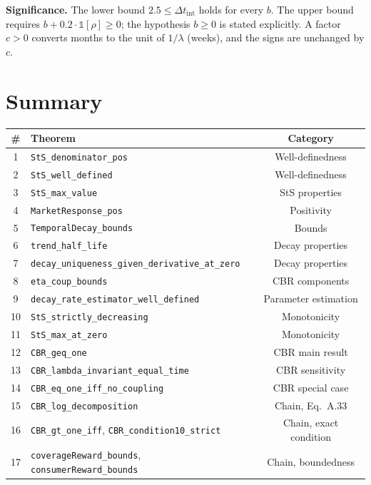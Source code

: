 \documentclass[11pt,a4paper]{article}
\begin{document}
	\noindent\textbf{Significance.} The lower bound $2.5\le\Delta t_{\text{int}}$ holds for every $b$. The upper bound requires $b+0.2\cdot\mathbb{1}[\rho]\ge0$; the hypothesis $b\ge0$ is stated explicitly. A factor $c>0$ converts months to the unit of $1/\lambda$ (weeks), and the signs are unchanged by $c$.


	\section*{Summary}
	
	\begin{table}[h]
		\centering
		\begin{tabular}{@{}clc@{}}
			\toprule
			\textbf{\#} & \textbf{Theorem} & \textbf{Category} \\
			\midrule
			1 & \texttt{StS\_denominator\_pos} & Well-definedness \\
			2 & \texttt{StS\_well\_defined} & Well-definedness \\
			3 & \texttt{StS\_max\_value} & StS properties \\
			4 & \texttt{MarketResponse\_pos} & Positivity \\
			5 & \texttt{TemporalDecay\_bounds} & Bounds \\
			6 & \texttt{trend\_half\_life} & Decay properties \\
			7 & \texttt{decay\_uniqueness\_given\_derivative\_at\_zero} & Decay properties \\
			8 & \texttt{eta\_coup\_bounds} & CBR components \\
			9 & \texttt{decay\_rate\_estimator\_well\_defined} & Parameter estimation \\
			10 & \texttt{StS\_strictly\_decreasing} & Monotonicity \\
			11 & \texttt{StS\_max\_at\_zero} & Monotonicity \\
			12 & \texttt{CBR\_geq\_one} & CBR main result \\
			13 & \texttt{CBR\_lambda\_invariant\_equal\_time} & CBR sensitivity \\
			14 & \texttt{CBR\_eq\_one\_iff\_no\_coupling} & CBR special case \\
			15 & \texttt{CBR\_log\_decomposition} & Chain, Eq.\ A.33 \\
			16 & \texttt{CBR\_gt\_one\_iff}, \texttt{CBR\_condition10\_strict} & Chain, exact condition \\
			17 & \texttt{coverageReward\_bounds}, \texttt{consumerReward\_bounds} & Chain, boundedness \\

\end{tabular}
\end{table}
\end{document}
